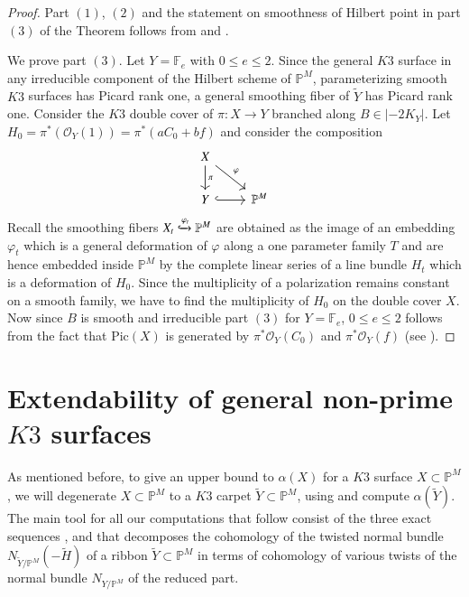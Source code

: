 \documentclass[11pt,twoside]{amsart}
\theoremstyle{plain}
\numberwithin{equation}{section}
\theoremstyle{definition}
\begin{document}
\begin{proof} Part $(1)$, $(2)$ and the statement on smoothness of Hilbert point in part $(3)$ of the Theorem follows from \cite[Theorem $3.1 (3)$, Theorem $4.3$, Theorem $5.1$]{BMR21} and \cite[Proposition $1.7$, Theorem $3.5$, Theorem $4.1$]{GP97}.
    

We prove part $(3)$. Let $Y = \mathbb{F}_e$ with $0 \leq e \leq 2$. Since the general $K3$ surface in any irreducible component of the Hilbert scheme of $\mathbb{P}^M$, parameterizing smooth $K3$ surfaces has Picard rank one, a general smoothing fiber of $\widetilde{Y}$ has Picard rank one. Consider the $K3$ double cover of $\pi:X \to Y$ branched along $B \in |-2K_Y|$. Let $H_0 = \pi^*(\mathcal{O}_{Y}(1)) = \pi^*(aC_0+bf)$ and consider the composition  
\[
\begin{tikzcd}
X \arrow[dr, "\varphi"] \arrow[d, "\pi"] & \\
Y \arrow[r, hook] & \mathbb{P}^M
\end{tikzcd}
\]
Recall the smoothing fibers $X_t \xhookrightarrow{\varphi_t} \mathbb{P}^M$ are obtained as the image of an embedding $\varphi_t$ which is a general deformation of $\varphi$ along a one parameter family $T$ and are hence embedded inside $\mathbb{P}^M$ by the complete linear series of a line bundle $H_t$ which is a deformation of $H_0$. Since the multiplicity of a polarization remains constant on a smooth family, we have to find the multiplicity of $H_0$ on the double cover $X$. Now since $B$ is smooth and irreducible part $(3)$ for $Y = \mathbb{F}_e$, $0 \leq e \leq 2$ follows from the fact that $\textrm{Pic}(X)$ is generated by $\pi^*\mathcal{O}_Y(C_0)$ and $\pi^*\mathcal{O}_Y(f)$ (see \cite[Proposition $6.3$]{AHL10}).

\end{proof}

\section{Extendability of general non-prime $K3$ surfaces}





As mentioned before, to give an upper bound to $\alpha(X)$ for a $K3$ surface $X \subset \mathbb{P}^M$, we will degenerate $X \subset \mathbb{P}^M$ to a $K3$ carpet $\widetilde{Y} \subset \mathbb{P}^M$, using  and compute $\alpha(\widetilde{Y})$.  The main tool for all our computations that follow consist of the three exact sequences ,  and   that decomposes the cohomology of the twisted normal bundle $N_{\widetilde{Y}/\mathbb{P}^M}(-\widetilde{H})$ of a ribbon $\widetilde{Y} \subset \mathbb{P}^M$ in terms of cohomology of various twists of the normal bundle $N_{Y/\mathbb{P}^M}$ of the reduced part. 
\end{document}
